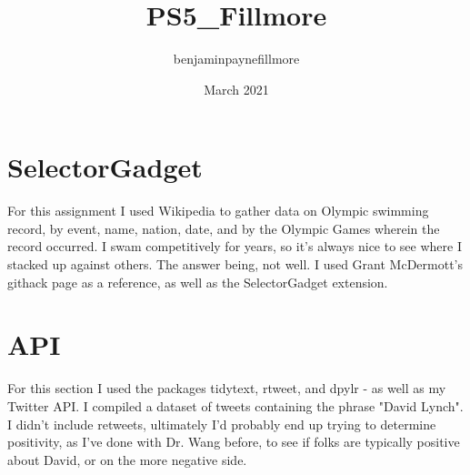 \documentclass{article}
\title{PS5_Fillmore}
\author{benjaminpaynefillmore }
\date{March 2021}
\begin{document}
\maketitle

\section{SelectorGadget}
For this assignment I used Wikipedia to gather data on Olympic swimming record, by event, name, nation, date, and by the Olympic Games wherein the record occurred. I swam competitively for years, so it's always nice to see where I stacked up against others. The answer being, not well. I used Grant McDermott's githack page as a reference, as well as the SelectorGadget extension.

\section{API}
For this section I used the packages tidytext, rtweet, and dpylr - as well as my Twitter API.
I compiled a dataset of tweets containing the phrase "David Lynch". I didn't include retweets, ultimately I'd probably end up trying to determine positivity, as I've done with Dr. Wang before, to see if folks are typically positive about David, or on the more negative side.
\end{document}
